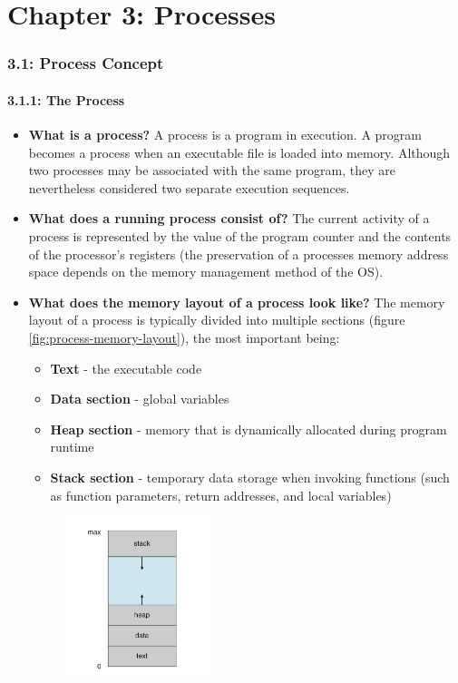 \documentclass[12pt]{article}
\begin{document}
\part*{Chapter 3: Processes}

\section*{3.1: Process Concept}

\subsection*{3.1.1: The Process}

\begin{itemize}
    \item \textbf{What is a process?} A process is a program in execution. A program becomes a process when an executable file is loaded into memory. Although two processes may be associated with the same program, they are nevertheless considered two separate execution sequences.
    \item \textbf{What does a running process consist of?} The current activity of a process is represented by the value of the program counter and the contents of the processor's registers (the preservation of a processes memory address space depends on the memory management method of the OS).
    \item \textbf{What does the memory layout of a process look like?} The memory layout of a process is typically divided into multiple sections (figure \ref{fig:process-memory-layout}), the most important being:
        \begin{itemize}
            \item \textbf{Text} - the executable code
            \item \textbf{Data section} - global variables
            \item \textbf{Heap section} - memory that is dynamically allocated during program runtime
            \item \textbf{Stack section} - temporary data storage when invoking functions (such as function parameters, return addresses, and local variables)
        \end{itemize}
        \begin{figure}[ht]
            \centering
            \includegraphics[width=0.4\textwidth]{figures/process-memory-layout.jpg}

\end{figure}
\end{itemize}
\end{document}
